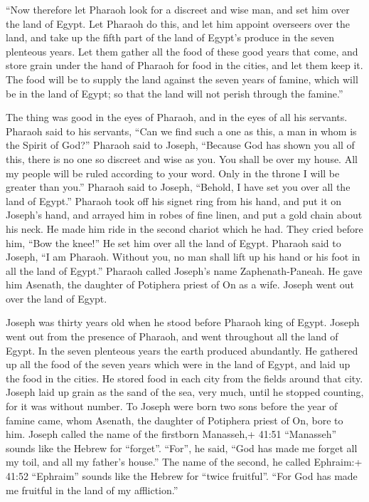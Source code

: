  ``Now therefore let Pharaoh look for a discreet and wise
man, and set him over the land of Egypt.  Let Pharaoh do
this, and let him appoint overseers over the land, and take up the fifth
part of the land of Egypt's produce in the seven plenteous years.
 Let them gather all the food of these good years that
come, and store grain under the hand of Pharaoh for food in the cities,
and let them keep it.  The food will be to supply the land
against the seven years of famine, which will be in the land of Egypt;
so that the land will not perish through the famine.''

 The thing was good in the eyes of Pharaoh, and in the eyes
of all his servants.  Pharaoh said to his servants, ``Can
we find such a one as this, a man in whom is the Spirit of God?''
 Pharaoh said to Joseph, ``Because God has shown you all of
this, there is no one so discreet and wise as you.  You
shall be over my house. All my people will be ruled according to your
word. Only in the throne I will be greater than you.'' 
Pharaoh said to Joseph, ``Behold, I have set you over all the land of
Egypt.''  Pharaoh took off his signet ring from his hand,
and put it on Joseph's hand, and arrayed him in robes of fine linen, and
put a gold chain about his neck.  He made him ride in the
second chariot which he had. They cried before him, ``Bow the knee!'' He
set him over all the land of Egypt.  Pharaoh said to
Joseph, ``I am Pharaoh. Without you, no man shall lift up his hand or
his foot in all the land of Egypt.''  Pharaoh called
Joseph's name Zaphenath-Paneah. He gave him Asenath, the daughter of
Potiphera priest of On as a wife. Joseph went out over the land of
Egypt.

 Joseph was thirty years old when he stood before Pharaoh
king of Egypt. Joseph went out from the presence of Pharaoh, and went
throughout all the land of Egypt.  In the seven plenteous
years the earth produced abundantly.  He gathered up all
the food of the seven years which were in the land of Egypt, and laid up
the food in the cities. He stored food in each city from the fields
around that city.  Joseph laid up grain as the sand of the
sea, very much, until he stopped counting, for it was without number.
 To Joseph were born two sons before the year of famine
came, whom Asenath, the daughter of Potiphera priest of On, bore to him.
 Joseph called the name of the firstborn Manasseh,+ 41:51
``Manasseh'' sounds like the Hebrew for ``forget''. ``For'', he said,
``God has made me forget all my toil, and all my father's house.''
 The name of the second, he called Ephraim:+ 41:52
``Ephraim'' sounds like the Hebrew for ``twice fruitful''. ``For God has
made me fruitful in the land of my affliction.''

